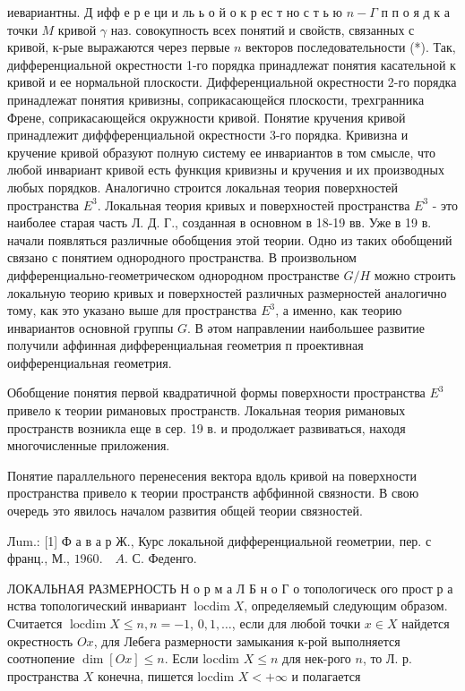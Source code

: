 \documentclass[10pt]{article}
\begin{document}
иевариантны. Д ифф е р е ци и ль ь о й $о$ к р ес т но с т ь ю $n-\Gamma$ п п о я д к а точки $M$ кривой $\gamma$ наз. совокупность всех понятий и свойств, связанных с кривой, к-рые выражаются через первые $n$ векторов последовательности (*). Так, дифференциальной окрестности 1-го порядка принадлежат понятия касательной к кривой и ее нормальной плоскости. Дифференциальной окрестности 2-го порядка принадлежат понятия кривизны, соприкасающейся плоскости, трехгранника Френе, соприкасающейся окружности кривой. Понятие кручения кривой принадлежит диффференциальной окрестности 3-го порядка. Кривизна и кручение кривой образуют полную систему ее инвариантов в том смысле, что любой инвариант кривой есть функция кривизны и кручения и их производных любых порядков. Аналогично строится локальная теория поверхностей пространства $E^{3}$. Локальная теория кривых и поверхностей пространства $E^{3}$ - это наиболее старая часть Л. Д. Г., созданная в основном в 18-19 вв. Уже в 19 в. начали появляться различные обобщения этой теории. Одно из таких обобщений связано с понятием однородного пространства. В произвольном дифференциально-геометрическом однородном пространстве $G / H$ можно строить локальную теорию кривых и поверхностей различных размерностей аналогично тому, как это указано выше для пространства $E^{3}$, а именно, как теорию инвариантов основной группы $G$. В әтом направлении наибольшее развитие получили аффинная дифференциальная геометрия п проективная оифференциальная геометрия.



Обобщение понятия первой квадратичной формы поверхности пространства $E^{3}$ привело к теории римановых пространств. Локальная теория римановых пространств возникла еще в сер. 19 в. и продолжает развиваться, находя многочисленные приложения.



Понятие параллельного перенесения вектора вдоль кривоӥ на поверхности пространства привело к теории пространств афбфинной связности. В свою очередь это явилось началом развития общей теории связностей.



Лum.: [1] Ф а в а р Ж., Курс локальной дифференциальной геометрии, пер. с франц., М., $1960 . \quad A$. С. Феденго.



ЛОКАЛЬНАЯ РАЗМЕРНОСТЬ Н о р м а Л Б н о Г о топологическ ого прост р а нства топологический инвариант $\operatorname{locdim} X$, определяемый следующим образом. Считается $\operatorname{locdim} X \leqslant n, n=-1$, $0,1, \ldots$, если для любой точки $x \in X$ найдется окрестность $O x$, для Лебега размерности замыкания к-рой выполняется соотнопение $\operatorname{dim}[O x] \leqslant n$. Если locdim $X \leqslant n$ для нек-рого $n$, то Л. р. пространства $X$ конечна, пишется locdim $X<+\infty$ и полагается
\end{document}
